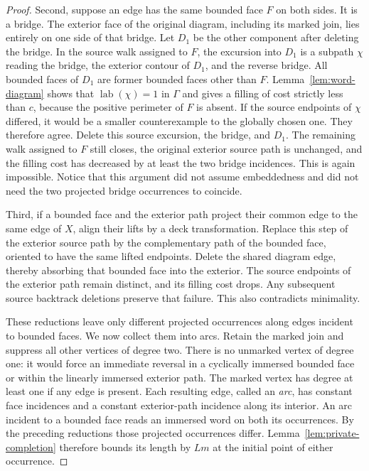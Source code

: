 \begin{proof}
Second, suppose an edge has the same bounded face $F$ on both sides.
It is a bridge.  The exterior face of the original diagram, including
its marked join, lies entirely on one side of that bridge.  Let $D_1$
be the other component after deleting the bridge.  In the source walk
assigned to $F$, the excursion into $D_1$ is a subpath $\chi$ reading the
bridge, the exterior contour of $D_1$, and the reverse bridge.  All
bounded faces of $D_1$ are former bounded faces other than $F$.
Lemma~\ref{lem:word-diagram} shows that $\operatorname{lab}(\chi)=1$ in $\Gamma$ and
gives a filling of cost strictly less than $c$, because the positive
perimeter of $F$ is absent.  If the source endpoints of $\chi$ differed,
it would be a smaller counterexample to the globally chosen one.
They therefore agree.  Delete this source excursion, the bridge, and
$D_1$.  The remaining walk assigned to $F$ still closes, the original
exterior source path is unchanged, and the filling cost has decreased
by at least the two bridge incidences.  This is again impossible.
Notice that this argument did not assume embeddedness and did not need
the two projected bridge occurrences to coincide.

Third, if a bounded face and the exterior path project their common edge
to the same edge of $X$, align their lifts by a deck transformation.
Replace this step of the exterior source path by the complementary path
of the bounded face, oriented to have the same lifted endpoints.  Delete
the shared diagram edge, thereby absorbing that bounded face into the
exterior.  The source endpoints of the exterior path remain distinct,
and its filling cost drops.  Any subsequent source backtrack deletions
preserve that failure.  This also contradicts minimality.

These reductions leave only different projected occurrences along edges
incident to bounded faces.  We now collect them into arcs.  Retain the
marked join and suppress all other vertices of degree two.
There is no unmarked vertex of degree one: it would force an immediate
reversal in a cyclically immersed bounded face or within the linearly
immersed exterior path.  The marked vertex has degree at least one if
any edge is present.  Each resulting edge, called an \emph{arc}, has
constant face incidences and a constant exterior-path incidence along
its interior.  An arc incident to a bounded face reads an immersed word
on both its occurrences.  By the preceding reductions those projected
occurrences differ.  Lemma~\ref{lem:private-completion} therefore bounds
its length by $Lm$ at the initial point of either occurrence.


\end{proof}
